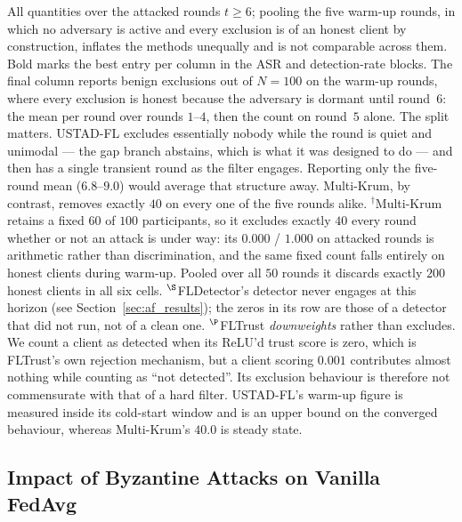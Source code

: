 \documentclass[journal]{IEEEtran}
\begin{document}
\begin{table}[!t]
\vspace{2pt}
{\footnotesize \raggedright All quantities over the attacked rounds $t \ge 6$; pooling the five warm-up rounds, in which no adversary is active and every exclusion is of an honest client by construction, inflates the methods unequally and is not comparable across them. Bold marks the best entry per column in the ASR and detection-rate blocks. The final column reports benign exclusions out of $N=100$ on the warm-up rounds, where every exclusion is honest because the adversary is dormant until round~$6$: the mean per round over rounds $1$--$4$, then the count on round~$5$ alone. The split matters. USTAD-FL excludes essentially nobody while the round is quiet and unimodal --- the gap branch abstains, which is what it was designed to do --- and then has a single transient round as the filter engages. Reporting only the five-round mean ($6.8$--$9.0$) would average that structure away. Multi-Krum, by contrast, removes exactly $40$ on every one of the five rounds alike. $^\dagger$Multi-Krum retains a fixed $60$ of $100$ participants, so it excludes exactly $40$ every round whether or not an attack is under way: its $0.000$ / $1.000$ on attacked rounds is arithmetic rather than discrimination, and the same fixed count falls entirely on honest clients during warm-up. Pooled over all $50$ rounds it discards exactly $200$ honest clients in all six cells. $^{\S}$FLDetector's detector never engages at this horizon (see Section~\ref{sec:af_results}); the zeros in its row are those of a detector that did not run, not of a clean one. $^{\P}$FLTrust \emph{downweights} rather than excludes. We count a client as detected when its ReLU'd trust score is zero, which is FLTrust's own rejection mechanism, but a client scoring $0.001$ contributes almost nothing while counting as ``not detected''. Its exclusion behaviour is therefore not commensurate with that of a hard filter. USTAD-FL's warm-up figure is measured inside its cold-start window and is an upper bound on the converged behaviour, whereas Multi-Krum's $40.0$ is steady state.\par}
\end{table}

\subsection{Impact of Byzantine Attacks on Vanilla FedAvg}
\end{document}

